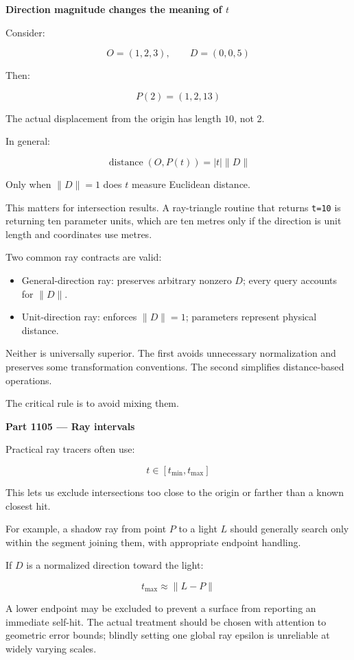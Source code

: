 \textbf{Direction magnitude changes the meaning of \(t\)}

Consider:

\[
O=(1,2,3),\qquad D=(0,0,5)
\]

Then:

\[
P(2)=(1,2,13)
\]

The actual displacement from the origin has length \(10\), not \(2\).

In general:

\[
\operatorname{distance}(O,P(t))=|t|\|D\|
\]

Only when \(\|D\|=1\) does \(t\) measure Euclidean distance.

This matters for intersection results. A ray-triangle routine that returns \texttt{t=10} is returning ten parameter units, which are ten metres only if the direction is unit length and coordinates use metres.

Two common ray contracts are valid:

\begin{itemize}
\tightlist
\item
  General-direction ray: preserves arbitrary nonzero \(D\); every query accounts for \(\|D\|\).
\item
  Unit-direction ray: enforces \(\|D\|=1\); parameters represent physical distance.
\end{itemize}

Neither is universally superior. The first avoids unnecessary normalization and preserves some transformation conventions. The second simplifies distance-based operations.

The critical rule is to avoid mixing them.

\textbf{Part 1105 --- Ray intervals}

Practical ray tracers often use:

\[
t\in[t_{\min},t_{\max}]
\]

This lets us exclude intersections too close to the origin or farther than a known closest hit.

For example, a shadow ray from point \(P\) to a light \(L\) should generally search only within the segment joining them, with appropriate endpoint handling.

If \(D\) is a normalized direction toward the light:

\[
t_{\max}\approx\|L-P\|
\]

A lower endpoint may be excluded to prevent a surface from reporting an immediate self-hit. The actual treatment should be chosen with attention to geometric error bounds; blindly setting one global ray epsilon is unreliable at widely varying scales.

